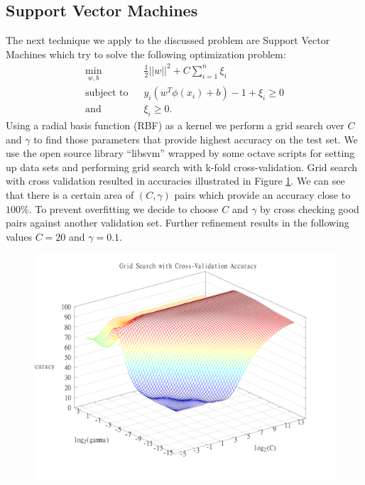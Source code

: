 \documentclass{article}
\begin{document}
\subsection{Support Vector Machines}
The next technique we apply to the discussed problem are Support Vector Machines \cite{Bishop200608} which try to solve the following optimization problem:
\begin{align*}
\min_{w,b} &~~ \frac{1}{2}||w||^2 + C \sum_{i=1}^{n} \xi_i\\
\text{subject to } &~~ y_i(w^T \phi(x_i) + b) - 1 + \xi_i \ge 0\\
\text{and} &~~ \xi_i \ge 0.
\end{align*}
Using a radial basis function (RBF) as a kernel we perform a grid search over $C$ and $\gamma$ to find those parameters that provide highest accuracy on the test set. We use the open source library ``libsvm'' \cite{chang2011libsvm} wrapped by some octave scripts for setting up data sets and performing grid search with k-fold cross-validation. Grid search with cross validation resulted in accuracies illustrated in Figure \ref{fig:svm_grid_search}. We can see that there is a certain area of $(C,\gamma)$ pairs which provide an accuracy close to $100\%$. To prevent overfitting we decide to choose $C$ and $\gamma$ by cross checking good pairs against another validation set. Further refinement results in the following values $C = 20$ and $\gamma = 0.1$.
\begin{figure}[ht]
	\centerline{\includegraphics[scale=0.20, trim=0 0 10 0]{../gridSearchSVMPlot}}
	\caption{}
	\label{fig:svm_grid_search}
\end{figure}
\end{document}
